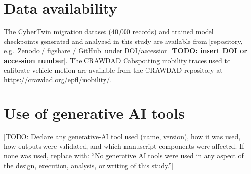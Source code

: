 \documentclass[10pt,letterpaper]{article}
\begin{document}
\section*{Data availability}
The CyberTwin migration dataset (40{,}000 records) and trained model
checkpoints generated and analyzed in this study are available from
[repository, e.g.\ Zenodo / figshare / GitHub] under DOI/accession
[\textbf{TODO: insert DOI or accession number}]. The CRAWDAD Cabspotting
mobility traces used to calibrate vehicle motion are available from the
CRAWDAD repository at https://crawdad.org/epfl/mobility/.

\section*{Use of generative AI tools}
[TODO: Declare any generative-AI tool used (name, version), how it was used,
how outputs were validated, and which manuscript components were affected.
If none was used, replace with: ``No generative AI tools were used in any
aspect of the design, execution, analysis, or writing of this study.'']

\nolinenumbers


% 


\end{document}
